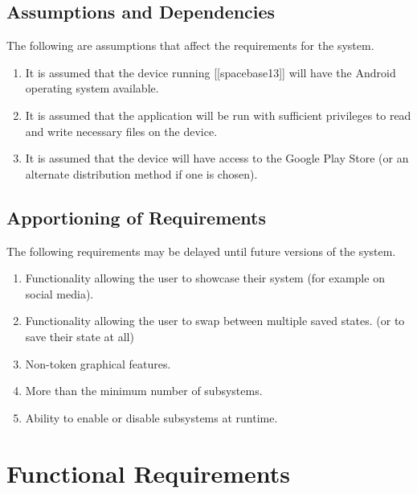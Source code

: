 \documentclass[]{article}
\begin{document}
\subsection{Assumptions and Dependencies}
\label{sub:assumptions_and_dependencies}
	The following are assumptions that affect the requirements for the system.
	\begin{enumerate}
	\item It is assumed that the device running [[spacebase13]] will have the Android operating system available.
	\item It is assumed that the application will be run with sufficient privileges to read and write necessary files on the device.
	\item  It is assumed that the device will have access to the Google Play Store (or an alternate distribution method if one is chosen).
	\end{enumerate}

\subsection{Apportioning of Requirements}
\label{sub:apportioning_of_requirements}
	The following requirements may be delayed until future versions of the system.
	\begin{enumerate}
		\item Functionality allowing the user to showcase their system (for example on social media).
		\item Functionality allowing the user to swap between multiple saved states. (or to save their state at all)
		\item Non-token graphical features.
		\item More than the minimum number of subsystems.
		\item Ability to enable or disable subsystems at runtime.
	\end{enumerate}

\section{Functional Requirements}
\label{sec:functional_requirements}
\end{document}

